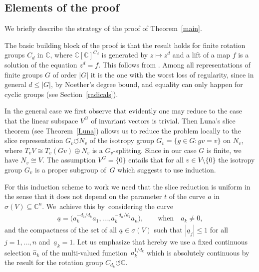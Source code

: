\documentclass[pdftex]{sigma}
\numberwithin{equation}{section}
\def\si{\sigma}
\def\C{\mathbb{C}}
\def\ul{\underline}
\def\we{\hat}
\def\acts{\circlearrowleft}
\begin{document}
\subsection{Elements of the proof}

We briefly describe the strategy of the proof of Theorem~\ref{main}.

The basic building block of the proof is that the result holds for finite rotation groups $C_d$ in $\C$,
where $\C[\C]^{C_d}$ is generated by $z \mapsto z^d$ and a lift of a map $f$ is a solution of the equation
$z^d = f$. This follows from \cite{GhisiGobbino13}.
Among all representations of finite groups $G$ of order $|G|$ it is the one
with the worst loss of
regularity, since in general $d \le |G|$, by Noether's degree bound, and equality can only happen for
cyclic groups (see Section~\ref{radicals}).

In the general case we first observe that evidently one may reduce to the case that the linear subspace
$V^G$ of invariant vectors is trivial. Then
Luna's slice theorem (see Theorem~\ref{Luna}) allows us to reduce the problem locally to the
slice representation $G_v \acts N_v$ of the isotropy group $G_v = \{g \in G \colon gv=v\}$ on $N_v$, where
$T_v V \cong T_v (Gv) \oplus N_v$ is a $G_v$-splitting. Since in our case $G$ is finite, we have $N_v \cong V$.
The assumption $V^G = \{0\}$ entails that for all $v \in V \setminus \{0\}$ the isotropy group $G_v$
is a proper subgroup of~$G$ which suggests to use induction.

For this induction scheme to work we need that the slice reduction is uniform in the sense that it
does not depend on the parameter $t$ of the curve $a$ in $\si(V) \subseteq \C^n$. We~achieve this by~considering the curve
\begin{gather*}
 \ul a = \big(a_k^{-d_1/d_k} a_1,\dots, a_k^{-d_n/d_k} a_n\big), \qquad \text{when}\quad a_k \ne 0,
\end{gather*}
and the compactness of the set of all $\ul a \in \si(V)$ such that $|\ul a_j|\le 1$ for all $j = 1,\dots,n$
and~\mbox{$\ul a_k = 1$}.
Let us emphasize that hereby we use a fixed continuous selection $\we a_k$ of the multi-valued function~$a_k^{1/d_k}$ which is absolutely continuous by the result for the rotation group $C_{d_k} \acts \C$.
\end{document}
